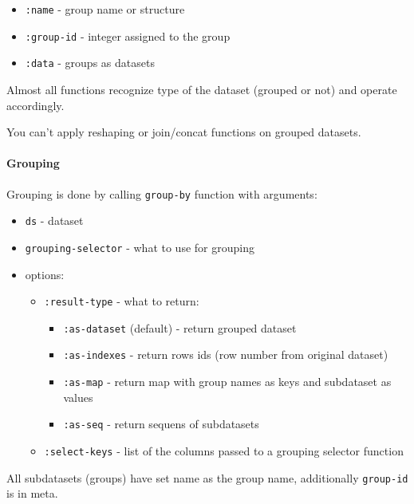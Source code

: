 \documentclass[]{article}
\providecommand{\tightlist}{%
  \setlength{\itemsep}{0pt}\setlength{\parskip}{0pt}}
\let\oldparagraph\paragraph
\renewcommand{\paragraph}[1]{\oldparagraph{#1}\mbox{}}
\begin{document}
\begin{itemize}
\tightlist
\item
  \texttt{:name} - group name or structure
\item
  \texttt{:group-id} - integer assigned to the group
\item
  \texttt{:data} - groups as datasets
\end{itemize}

Almost all functions recognize type of the dataset (grouped or not) and
operate accordingly.

You can't apply reshaping or join/concat functions on grouped datasets.

\paragraph{Grouping}\label{grouping}

Grouping is done by calling \texttt{group-by} function with arguments:

\begin{itemize}
\tightlist
\item
  \texttt{ds} - dataset
\item
  \texttt{grouping-selector} - what to use for grouping
\item
  options:

  \begin{itemize}
  \tightlist
  \item
    \texttt{:result-type} - what to return:

    \begin{itemize}
    \tightlist
    \item
      \texttt{:as-dataset} (default) - return grouped dataset
    \item
      \texttt{:as-indexes} - return rows ids (row number from original
      dataset)
    \item
      \texttt{:as-map} - return map with group names as keys and
      subdataset as values
    \item
      \texttt{:as-seq} - return sequens of subdatasets
    \end{itemize}
  \item
    \texttt{:select-keys} - list of the columns passed to a grouping
    selector function
  \end{itemize}
\end{itemize}

All subdatasets (groups) have set name as the group name, additionally
\texttt{group-id} is in meta.
\end{document}
